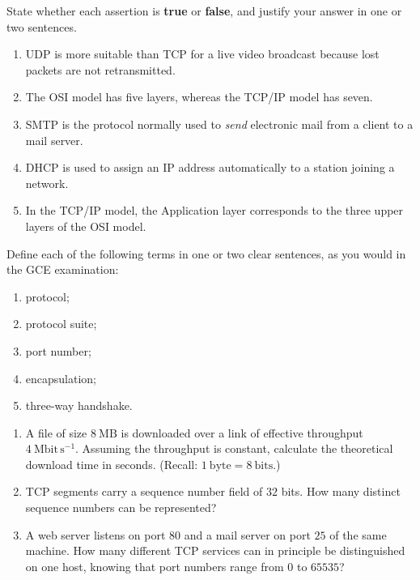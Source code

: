 \documentclass[11pt]{article}
\begin{document}
\begin{exercice}
State whether each assertion is \textbf{true} or \textbf{false}, and justify your answer in one or two sentences.
\begin{enumerate}
\item UDP is more suitable than TCP for a live video broadcast because lost packets are not retransmitted.
\item The OSI model has five layers, whereas the TCP/IP model has seven.
\item SMTP is the protocol normally used to \emph{send} electronic mail from a client to a mail server.
\item DHCP is used to assign an IP address automatically to a station joining a network.
\item In the TCP/IP model, the Application layer corresponds to the three upper layers of the OSI model.
\end{enumerate}
\end{exercice}

\begin{exercice}[Definitions]
Define each of the following terms in one or two clear sentences, as you would in the GCE examination:
\begin{enumerate}
\item protocol;
\item protocol suite;
\item port number;
\item encapsulation;
\item three-way handshake.
\end{enumerate}
\end{exercice}

\begin{exercice}
\begin{enumerate}
\item A file of size $8\ \mathrm{MB}$ is downloaded over a link of effective throughput $4\ \mathrm{Mbit\,s^{-1}}$. Assuming the throughput is constant, calculate the theoretical download time in seconds. (Recall: $1\ \mathrm{byte} = 8\ \mathrm{bits}$.)
\item TCP segments carry a sequence number field of $32$ bits. How many distinct sequence numbers can be represented?
\item A web server listens on port $80$ and a mail server on port $25$ of the same machine. How many different TCP services can in principle be distinguished on one host, knowing that port numbers range from $0$ to $65535$?
\end{enumerate}
\end{exercice}
\end{document}
